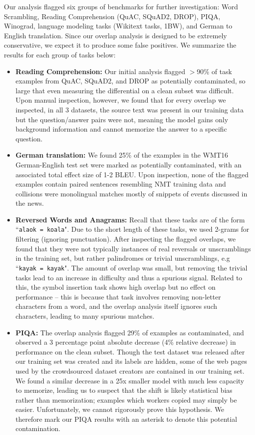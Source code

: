 Our analysis flagged six groups of benchmarks for further investigation: Word Scrambling, Reading Comprehension (QuAC, SQuAD2, DROP), PIQA, Winograd, language modeling tasks (Wikitext tasks, 1BW), and German to English translation. Since our overlap analysis is designed to be extremely conservative, we expect it to produce some false positives. We summarize the results for each group of tasks below:
\begin{itemize}
    \item \textbf{Reading Comprehension:} Our initial analysis flagged $>$90\% of task examples from QuAC, SQuAD2, and DROP as potentially contaminated, so large that even measuring the differential on a clean subset was difficult. Upon manual inspection, however, we found that for every overlap we inspected, in all 3 datasets, the source text was present in our training data but the question/answer pairs were not, meaning the model gains only background information and cannot memorize the answer to a specific question.
    \item \textbf{German translation:} We found 25\% of the examples in the WMT16 German-English test set were marked as potentially contaminated, with an associated total effect size of 1-2 BLEU.  Upon inspection, none of the flagged examples contain paired sentences resembling NMT training data and collisions were monolingual matches mostly of snippets of events discussed in the news.
    \item \textbf{Reversed Words and Anagrams:} Recall that these tasks are of the form ``\texttt{alaok = koala}". Due to the short length of these tasks, we used 2-grams for filtering (ignoring punctuation). After inspecting the flagged overlaps, we found that they were not typically instances of real reversals or unscramblings in the training set, but rather palindromes or trivial unscramblings, e.g ``\texttt{kayak = kayak}". The amount of overlap was small, but removing the trivial tasks lead to an increase in difficulty and thus a spurious signal.  Related to this, the symbol insertion task shows high overlap but no effect on performance -- this is because that task involves removing non-letter characters from a word, and the overlap analysis itself ignores such characters, leading to many spurious matches.
    \item \textbf{PIQA:} The overlap analysis flagged 29\% of examples as contaminated, and observed a 3 percentage point absolute decrease (4\% relative decrease) in performance on the clean subset. Though the test dataset was released after our training set was created and its labels are hidden, some of the web pages used by the crowdsourced dataset creators are contained in our training set. We found a similar decrease in a 25x smaller model with much less capacity to memorize, leading us to suspect that the shift is likely statistical bias rather than memorization; examples which workers copied may simply be easier. Unfortunately, we cannot rigorously prove this hypothesis.  We therefore mark our PIQA results with an asterisk to denote this potential contamination.

\end{itemize}
